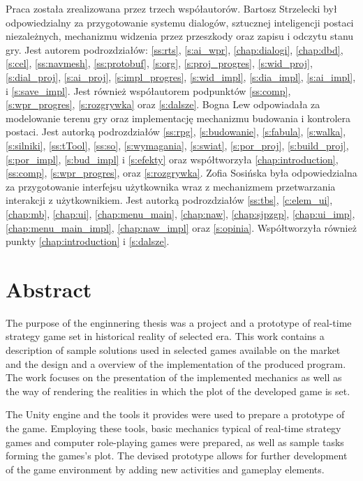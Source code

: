 Praca została zrealizowana przez trzech współautorów. Bartosz Strzelecki był odpowiedzialny za przygotowanie systemu
dialogów, sztucznej inteligencji postaci niezależnych, mechanizmu widzenia przez przeszkody oraz zapisu i odczytu stanu gry.
Jest autorem podrozdziałów: \ref{ss:rts},
\ref{s:ai_wpr}, \ref{chap:dialogi}, \ref{chap:dbd}, \ref{s:cel}, \ref{ss:navmesh}, \ref{ss:protobuf}, \ref{s:org}, \ref{s:proj_progres}, \ref{s:wid_proj},
\ref{s:dial_proj}, \ref{s:ai_proj}, \ref{s:impl_progres}, \ref{s:wid_impl}, \ref{s:dia_impl}, \ref{s:ai_impl}, i
\ref{s:save_impl}. Jest również współautorem podpunktów \ref{ss:comp}, \ref{s:wpr_progres}, \ref{s:rozgrywka} oraz \ref{s:dalsze}.
Bogna Lew odpowiadała za modelowanie terenu gry oraz implementację mechanizmu budowania i kontrolera postaci. Jest autorką
podrozdziałów \ref{ss:rpg}, \ref{s:budowanie}, \ref{s:fabula}, \ref{s:walka}, \ref{s:silniki},
\ref{ss:tTool}, \ref{ss:so}, \ref{s:wymagania}, \ref{s:swiat}, \ref{s:por_proj}, \ref{s:build_proj}, \ref{s:por_impl}, \ref{s:bud_impl} i
\ref{s:efekty} oraz współtworzyła \ref{chap:introduction}, \ref{ss:comp}, \ref{s:wpr_progres}, oraz \ref{s:rozgrywka}.
Zofia Sosińska była odpowiedzialna za przygotowanie interfejsu użytkownika wraz z mechanizmem przetwarzania interakcji z użytkownikiem. Jest
autorką podrozdziałów \ref{ss:tbs}, \ref{c:elem_ui}, \ref{chap:mb}, \ref{chap:ui},
\ref{chap:menu_main}, \ref{chap:naw}, \ref{chap:sjpzgp}, \ref{chap:ui_imp}, \ref{chap:menu_main_impl},
\ref{chap:naw_impl} oraz \ref{s:opinia}. Współtworzyła również punkty \ref{chap:introduction} i \ref{s:dalsze}.

\chapter*{Abstract}
The purpose of the enginnering thesis was a project and a prototype of real-time strategy game set in historical reality of selected era.
This work contains a description of sample solutions used in selected games available on the market
and the design and a overview of the implementation of the produced program. The work focuses on the presentation 
of the implemented mechanics as well as
the way of rendering the realities in which the plot of the developed game is set.

The Unity engine and the tools it provides were used to prepare a prototype of the game.
Employing these tools, basic mechanics typical of real-time strategy games and computer role-playing games were prepared,
as well as sample tasks forming the games's plot. The devised prototype allows for 
further development of the game environment by adding new activities and gameplay elements.

